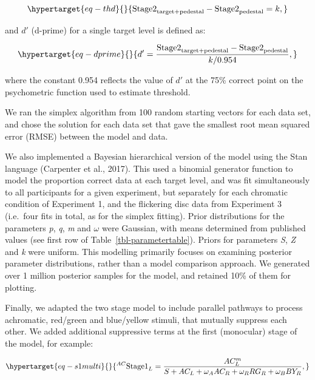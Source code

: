 \documentclass[
  letterpaper,
  DIV=11,
  numbers=noendperiod]{scrartcl}
\begin{document}
\begin{equation}\protect\hypertarget{eq-thd}{}{\mathrm{Stage2}_{\mathrm{target+pedestal}} - \mathrm{Stage2}_{\mathrm{pedestal}} = k,}\label{eq-thd}\end{equation}

and \(d'\) (d-prime) for a single target level is defined as:

\begin{equation}\protect\hypertarget{eq-dprime}{}{d' = \frac{\mathrm{Stage2}_{\mathrm{target+pedestal}} - \mathrm{Stage2}_{\mathrm{pedestal}}}{k/0.954},}\label{eq-dprime}\end{equation}

where the constant 0.954 reflects the value of \(d'\) at the 75\%
correct point on the psychometric function used to estimate threshold.

We ran the simplex algorithm from 100 random starting vectors for each
data set, and chose the solution for each data set that gave the
smallest root mean squared error (RMSE) between the model and data.

We also implemented a Bayesian hierarchical version of the model using
the Stan language (Carpenter et al., 2017). This used a binomial
generator function to model the proportion correct data at each target
level, and was fit simultaneously to all participants for a given
experiment, but separately for each chromatic condition of Experiment 1,
and the flickering disc data from Experiment 3 (i.e.~four fits in total,
as for the simplex fitting). Prior distributions for the parameters
\emph{p}, \emph{q}, \emph{m} and \(\omega\) were Gaussian, with means
determined from published values (see first row of
Table~\ref{tbl-parametertable}). Priors for parameters \emph{S},
\emph{Z} and \emph{k} were uniform. This modelling primarily focuses on
examining posterior parameter distributions, rather than a model
comparison approach. We generated over 1 million posterior samples for
the model, and retained 10\% of them for plotting.

Finally, we adapted the two stage model to include parallel pathways to
process achromatic, red/green and blue/yellow stimuli, that mutually
suppress each other. We added additional suppressive terms at the first
(monocular) stage of the model, for example:

\begin{equation}\protect\hypertarget{eq-s1multi}{}{^{AC}\mathrm{Stage1}_L = \frac{AC_L^m}{S + AC_L + \omega_A AC_R + \omega_R RG_R + \omega_B BY_R},}\label{eq-s1multi}\end{equation}
\end{document}
